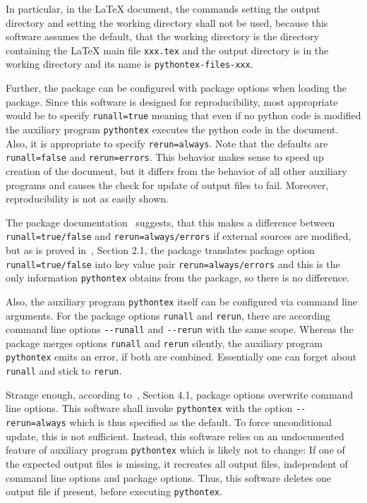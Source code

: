 In particular, in the \LaTeX{} document, 
the commands  setting the output directory 
and  setting the working directory shall not be used, 
because this software assumes the default, that the working directory is the directory 
containing the \LaTeX{} main file \texttt{xxx.tex}
and the output directory is in the working directory 
and its name is \texttt{pythontex-files-xxx}. 

Further, the package  can be configured with package options when loading the package. 
Since this software is designed for reproducibility, 
most appropriate would be to specify \texttt{runall=true} meaning that even if no python code is modified 
the auxiliary program \texttt{pythontex} executes the python code in the document. 
Also, it is appropriate to specify \texttt{rerun=always}. 
Note that the defaults are \texttt{runall=false} and \texttt{rerun=errors}. 
This behavior makes sense to speed up creation of the document, 
but it differs from the behavior of all other auxiliary programs 
and causes the check for update of output files to fail. 
Moreover, reproducibility is not as easily shown. 

The package documentation~\cite{PythonTexP} suggests, 
that this makes a difference between \texttt{runall=true/false} 
and \texttt{rerun=always/errors} if external sources are modified, 
but as is proved in~\cite{PyTexInOut}, Section 2.1, 
the package translates package option \texttt{runall=true/false} into key value pair \texttt{rerun=always/errors} 
and this is the only information \texttt{pythontex} obtains from the package, 
so there is no difference. 

Also, the auxiliary program \texttt{pythontex} itself can be configured via command line arguments. 
For the package options \texttt{runall} and \texttt{rerun}, 
there are according command line options \texttt{-{}-runall} and \texttt{-{}-rerun} with the same scope. 
Whereas the package merges options \texttt{runall} and \texttt{rerun} silently, 
the auxiliary program \texttt{pythontex} emits an error, if both are combined. 
Essentially one can forget about \texttt{runall} and stick to \texttt{rerun}. 

Strange enough, according to~\cite{PythonTexP}, Section 4.1, package options overwrite command line options. 
This software shall invoke \texttt{pythontex} 
with the option \texttt{-{}-rerun=always} which is thus specified as the default. 
To force unconditional update, this is not sufficient. 
Instead, this software relies on an undocumented feature of auxiliary program \texttt{pythontex} 
which is likely not to change: 
If one of the expected output files is missing, it recreates all output files, independent of command line options and package options. 
Thus, this software deletes one output file if present, before executing \texttt{pythontex}. 


